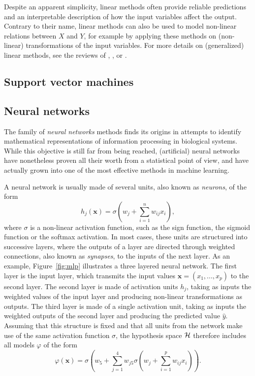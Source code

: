 Despite an apparent simplicity, linear methods often provide reliable
predictions and an interpretable description of how the input variables affect
the output. Contrary to their name, linear methods can also be used to model
non-linear relations between $X$ and $Y$, for example by applying these methods
on (non-linear) transformations of the input variables. For more details on
(generalized) linear methods, see the reviews of \citet{maccullagh:1989},
\citet{hastie:2005}, \citet{bishop:2006} or \citet{duda:2012}.

\subsection{Support vector machines}

\todo{}

\subsection{Neural networks}

The family of \textit{neural networks} methods finds its origins in attempts to
identify mathematical representations of information processing in biological
systems. While this objective is still far from being reached, (artificial)
neural networks have nonetheless proven all their worth from a statistical point of
view, and have actually grown into one of the most effective methods in machine
learning.

A neural network is usually made of several units, also known as \textit{neurons}, of the form
\begin{equation}
h_j(\mathbf{x}) = \sigma(w_j + \sum_{i=1}^n w_{ij} x_i),
\end{equation}
where $\sigma$ is a non-linear activation function, such as the sign function,
the sigmoid function or the softmax activation. In most cases, these units are
structured into successive layers, where the outputs of a layer are directed
through weighted connections, also known as \textit{synapses}, to the inputs of
the next layer. As an example, Figure~\ref{fig:mlp} illustrates a three layered
neural network. The first layer is the input layer, which transmits the input
values $\mathbf{x} = (x_1, ..., x_p)$ to the second layer. The second layer is
made of activation units $h_j$, taking as inputs the weighted values of the
input layer and producing non-linear transformations as outputs. The third
layer is made of a single activation unit, taking as inputs the weighted
outputs of the second layer and producing the predicted value $\hat{y}$.
Assuming that this structure is fixed and that all units from the network make
use of the same activation function $\sigma$, the hypothesis space ${\cal H}$
therefore includes all models $\varphi$ of the form
\begin{equation}
\varphi(\mathbf{x}) = \sigma(w_5 + \sum_{j=1}^4 w_{j5} \sigma(w_j + \sum_{i=1}^p w_{ij} x_i)).
\end{equation}

